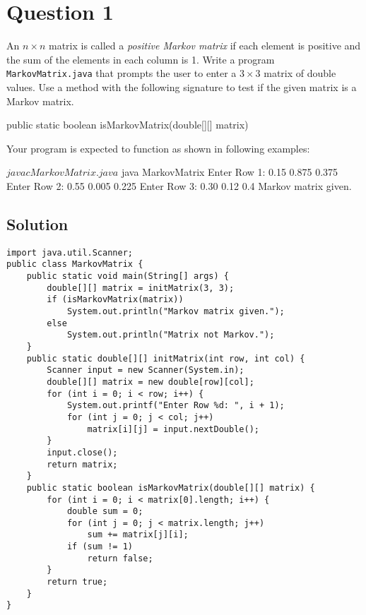 \section*{Question 1}

An $n \times n$ matrix is called a \textit{positive Markov matrix} if each element is positive and the sum of the elements in each column is 1.
Write a program \texttt{MarkovMatrix.java} that prompts the user to enter a $3 \times 3$ matrix of double values.
Use a method with the following signature to test if the given matrix is a Markov matrix.

\begin{terminal}
public static boolean isMarkovMatrix(double[][] matrix)
\end{terminal}

Your program is expected to function as shown in following examples:

\begin{terminal}
$ javac MarkovMatrix.java
$ java MarkovMatrix
Enter Row 1: 0.15 0.875 0.375
Enter Row 2: 0.55 0.005 0.225
Enter Row 3: 0.30 0.12 0.4
Markov matrix given.
\end{terminal}

\newpage

\subsection*{Solution}

\lstset{language=Java,tabsize=4}
\begin{lstlisting}
import java.util.Scanner;
public class MarkovMatrix {
	public static void main(String[] args) {
		double[][] matrix = initMatrix(3, 3);
		if (isMarkovMatrix(matrix))
			System.out.println("Markov matrix given.");
		else
			System.out.println("Matrix not Markov.");
	}
	public static double[][] initMatrix(int row, int col) {
		Scanner input = new Scanner(System.in);
		double[][] matrix = new double[row][col];
		for (int i = 0; i < row; i++) {
			System.out.printf("Enter Row %d: ", i + 1);
			for (int j = 0; j < col; j++)
				matrix[i][j] = input.nextDouble();
		}
		input.close();
		return matrix;
	}
	public static boolean isMarkovMatrix(double[][] matrix) {
		for (int i = 0; i < matrix[0].length; i++) {
			double sum = 0;
			for (int j = 0; j < matrix.length; j++)
				sum += matrix[j][i];
			if (sum != 1)
				return false;
		}
		return true;
	}
}
\end{lstlisting}

\newpage

